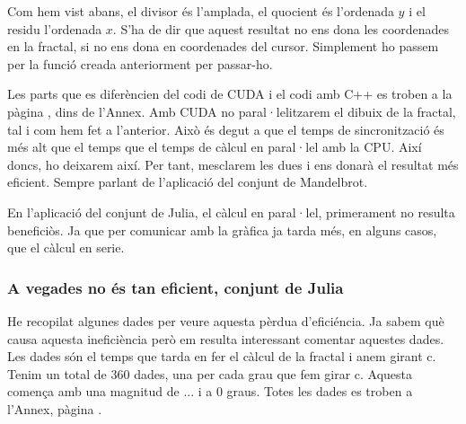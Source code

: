 \centerline{}

\begin{center}
    Com hem vist abans, el divisor és l'amplada, el quocient és l'ordenada $y$ i el residu l'ordenada $x$. S'ha de dir que aquest resultat no ens dona les coordenades en la fractal, si no ens dona en coordenades del cursor. Simplement ho passem per la funció creada anteriorment per passar-ho.
\end{center}

\noindent Les parts que es diferèncien del codi de CUDA i el codi amb C++ es troben a la pàgina \pageref{app:CUDA}, dins de l'Annex. \n
Amb CUDA no paral·lelitzarem el dibuix de la fractal, tal i com hem fet a l'anterior. Això és degut a que el temps de sincronització és més alt que el temps que el temps de càlcul en paral·lel amb la CPU. Així doncs, ho deixarem així. Per tant, mesclarem les dues i ens donarà el resultat més eficient. Sempre parlant de l'aplicació del conjunt de Mandelbrot. \n

\noindent En l'aplicació del conjunt de Julia, el càlcul en paral·lel, primerament no resulta beneficiòs. Ja que per comunicar amb la gràfica ja tarda més, en alguns casos, que el càlcul en serie.

\subsubsection{A vegades no és tan eficient, conjunt de Julia}
He recopilat algunes dades per veure aquesta pèrdua d'eficiéncia. Ja sabem què causa aquesta ineficiència però em resulta interessant comentar aquestes dades. \n
Les dades són el temps que tarda en fer el càlcul de la fractal i anem girant c. Tenim un total de 360 dades, una per cada grau que fem girar c. Aquesta comença amb una magnitud de ... i a 0 graus. Totes les dades es troben a l'Annex, pàgina \pageref{app:Julia_times}.
